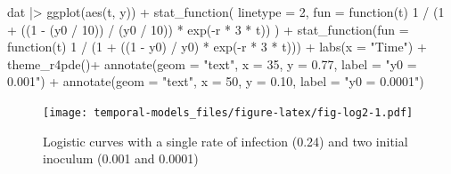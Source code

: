 \documentclass[
  letterpaper,
]{book}
\newenvironment{Shaded}{\begin{snugshade}}{\end{snugshade}}
\newcommand{\AttributeTok}[1]{\textcolor[rgb]{0.40,0.45,0.13}{#1}}
\newcommand{\ControlFlowTok}[1]{\textcolor[rgb]{0.00,0.23,0.31}{#1}}
\newcommand{\DecValTok}[1]{\textcolor[rgb]{0.68,0.00,0.00}{#1}}
\newcommand{\FloatTok}[1]{\textcolor[rgb]{0.68,0.00,0.00}{#1}}
\newcommand{\FunctionTok}[1]{\textcolor[rgb]{0.28,0.35,0.67}{#1}}
\newcommand{\NormalTok}[1]{\textcolor[rgb]{0.00,0.23,0.31}{#1}}
\newcommand{\SpecialCharTok}[1]{\textcolor[rgb]{0.37,0.37,0.37}{#1}}
\newcommand{\StringTok}[1]{\textcolor[rgb]{0.13,0.47,0.30}{#1}}
\begin{document}
\begin{Shaded}
\begin{Highlighting}[]
\NormalTok{dat }\SpecialCharTok{|\textgreater{}}
  \FunctionTok{ggplot}\NormalTok{(}\FunctionTok{aes}\NormalTok{(t, y)) }\SpecialCharTok{+}
  \FunctionTok{stat\_function}\NormalTok{(}
    \AttributeTok{linetype =} \DecValTok{2}\NormalTok{,}
    \AttributeTok{fun =} \ControlFlowTok{function}\NormalTok{(t) }\DecValTok{1} \SpecialCharTok{/}\NormalTok{ (}\DecValTok{1} \SpecialCharTok{+}\NormalTok{ ((}\DecValTok{1} \SpecialCharTok{{-}}\NormalTok{ (y0 }\SpecialCharTok{/} \DecValTok{10}\NormalTok{)) }\SpecialCharTok{/}\NormalTok{ (y0 }\SpecialCharTok{/} \DecValTok{10}\NormalTok{)) }\SpecialCharTok{*} \FunctionTok{exp}\NormalTok{(}\SpecialCharTok{{-}}\NormalTok{r }\SpecialCharTok{*} \DecValTok{3} \SpecialCharTok{*}\NormalTok{ t))}
\NormalTok{  ) }\SpecialCharTok{+}
  \FunctionTok{stat\_function}\NormalTok{(}\AttributeTok{fun =} \ControlFlowTok{function}\NormalTok{(t) }\DecValTok{1} \SpecialCharTok{/}\NormalTok{ (}\DecValTok{1} \SpecialCharTok{+}\NormalTok{ ((}\DecValTok{1} \SpecialCharTok{{-}}\NormalTok{ y0) }\SpecialCharTok{/}\NormalTok{ y0) }\SpecialCharTok{*} \FunctionTok{exp}\NormalTok{(}\SpecialCharTok{{-}}\NormalTok{r }\SpecialCharTok{*} \DecValTok{3} \SpecialCharTok{*}\NormalTok{ t))) }\SpecialCharTok{+}
  \FunctionTok{labs}\NormalTok{(}\AttributeTok{x =} \StringTok{"Time"}\NormalTok{) }\SpecialCharTok{+}
 \FunctionTok{theme\_r4pde}\NormalTok{()}\SpecialCharTok{+}
  \FunctionTok{annotate}\NormalTok{(}\AttributeTok{geom =} \StringTok{"text"}\NormalTok{, }\AttributeTok{x =} \DecValTok{35}\NormalTok{, }\AttributeTok{y =} \FloatTok{0.77}\NormalTok{, }\AttributeTok{label =} \StringTok{"y0 = 0.001"}\NormalTok{) }\SpecialCharTok{+}
  \FunctionTok{annotate}\NormalTok{(}\AttributeTok{geom =} \StringTok{"text"}\NormalTok{, }\AttributeTok{x =} \DecValTok{50}\NormalTok{, }\AttributeTok{y =} \FloatTok{0.10}\NormalTok{, }\AttributeTok{label =} \StringTok{"y0 = 0.0001"}\NormalTok{)}
\end{Highlighting}
\end{Shaded}

\begin{figure}

{\centering \texttt{[image: temporal-models\_files/figure-latex/fig-log2-1.pdf]}

}

\caption{\label{fig-log2}Logistic curves with a single rate of infection
(0.24) and two initial inoculum (0.001 and 0.0001)}

\end{figure}
\end{document}
